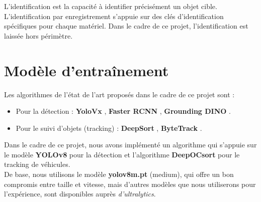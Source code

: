 L'identification est la capacité à identifier précisément un objet cible. L'identification par enregistrement s'appuie sur des clés d'identification spécifiques pour chaque matériel. Dans le cadre de ce projet, l'identification est laissée hors périmètre.


\section{Modèle d'entraînement}

Les algorithmes de l’état de l’art proposés dans le cadre de ce projet sont :

\begin{itemize}
    \item Pour la détection : \textbf{YoloVx} \cite{jocher2023yolo}, \textbf{Faster RCNN} \cite{ren2016faster}, \textbf{Grounding DINO} \cite{liu2023grounding}.
    \item Pour le suivi d’objets (tracking) : \textbf{DeepSort} \cite{wojke2017simple}, \textbf{ByteTrack} \cite{zhang2022bytetrack}.
\end{itemize}

Dans le cadre de ce projet, nous avons implémenté un algorithme qui s’appuie sur le modèle \textbf{YOLOv8} pour la détection et l’algorithme \textbf{DeepOCsort} \cite{maggioolino2023deep} pour le tracking de véhicules.\\

De base, nous utilisons le modèle \textbf{yolov8m.pt} (medium), qui offre un bon compromis entre taille et vitesse, mais d'autres modèles que nous utiliserons pour l'expérience, sont disponibles auprès \textit{d'ultralytics}.

